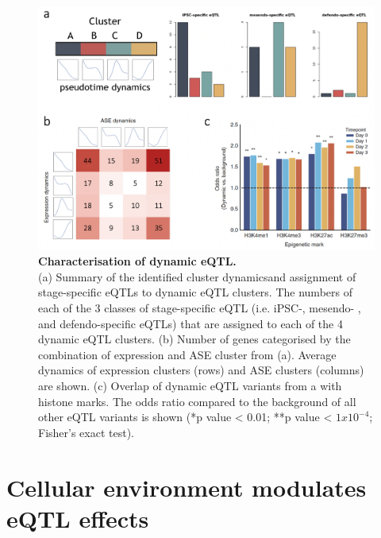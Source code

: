 \begin{figure}[htbp]
\centering
\includegraphics[width=15cm]{Chapter4/Fig/endodiff_dynamic_enrich.png}
\caption[Characterisation of dynamic eQTL]{\textbf{Characterisation of dynamic eQTL.}\\
(a) Summary of the identified cluster dynamics\footnotemark and assignment of stage-specific eQTLs to dynamic eQTL clusters. 
The numbers of each of the 3 classes of stage-specific eQTL (i.e. iPSC-, mesendo- , and defendo-specific eQTLs) that are assigned to each of the 4 dynamic eQTL clusters.
(b) Number of genes categorised by the combination of expression and ASE cluster from (a). 
Average dynamics of expression clusters (rows) and ASE clusters (columns) are shown.
(c) Overlap of dynamic eQTL variants from a with histone marks.
The odds ratio compared to the background of all other eQTL variants is shown (*p value < 0.01; **p value < $1x10^{-4}$; Fisher’s exact test).}
\label{fig:endodiff_dynamic_eqtl_enrichment}
\end{figure}


\clearpage

\section{Cellular environment modulates eQTL effects}

